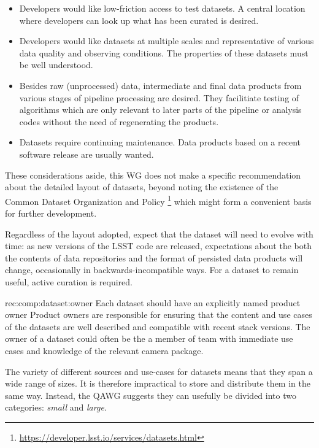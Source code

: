 \begin{itemize}
\item{
    Developers would like low-friction access to test datasets.
    A central location where developers can look up what has been curated is desired.
}
\item{
    Developers would like datasets at multiple scales and representative of various data quality and observing conditions.
    The properties of these datasets must be well understood.
}
\item{
    Besides raw (unprocessed) data, intermediate and final data products from various stages of pipeline processing are desired.
    They facilitiate testing of algorithms which are only relevant to later parts of the pipeline or analysis codes without the need of regenerating the products.
}
\item{
    Datasets require continuing maintenance.
    Data products based on a recent software release are usually wanted.
}
\end{itemize}

These considerations aside, this WG does not make a specific recommendation about the detailed layout of datasets, beyond noting the existence of the Common Dataset Organization and Policy \footnote{\url{https://developer.lsst.io/services/datasets.html}} which might form a convenient basis for further development.

Regardless of the layout adopted, expect that the dataset will need to evolve with time: as new versions of the LSST code are released, expectations about the both the contents of data repositories and the format of persisted data products will change, occasionally in backwards-incompatible ways.
For a dataset to remain useful, active curation is required.

\begin{recommendation}
    {rec:comp:dataset:owner}
    {Each dataset should have an explicitly named product owner}
Product owners are responsible for ensuring that the content and use cases of the datasets are well described and compatible with recent stack versions.
The owner of a dataset could often be the a member of team with immediate use cases and knowledge of the relevant camera package.
\end{recommendation}

The variety of different sources and use-cases for datasets means that they span a wide range of sizes.
It is therefore impractical to store and distribute them in the same way.
Instead, the QAWG suggests they can usefully be divided into two categories: \emph{small} and \emph{large}.

